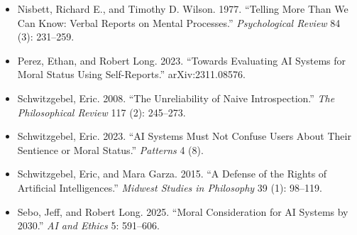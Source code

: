 \documentclass[11pt]{article}
\begin{document}
\begin{itemize}[leftmargin=2em, itemsep=2pt, label={}]
\item Nisbett, Richard E., and Timothy D. Wilson. 1977. ``Telling More Than We Can Know: Verbal Reports on Mental Processes.'' \emph{Psychological Review} 84 (3): 231--259.
\item Perez, Ethan, and Robert Long. 2023. ``Towards Evaluating AI Systems for Moral Status Using Self-Reports.'' arXiv:2311.08576.
\item Schwitzgebel, Eric. 2008. ``The Unreliability of Naive Introspection.'' \emph{The Philosophical Review} 117 (2): 245--273.
\item Schwitzgebel, Eric. 2023. ``AI Systems Must Not Confuse Users About Their Sentience or Moral Status.'' \emph{Patterns} 4 (8).
\item Schwitzgebel, Eric, and Mara Garza. 2015. ``A Defense of the Rights of Artificial Intelligences.'' \emph{Midwest Studies in Philosophy} 39 (1): 98--119.
\item Sebo, Jeff, and Robert Long. 2025. ``Moral Consideration for AI Systems by 2030.'' \emph{AI and Ethics} 5: 591--606.
\end{itemize}
\end{document}
